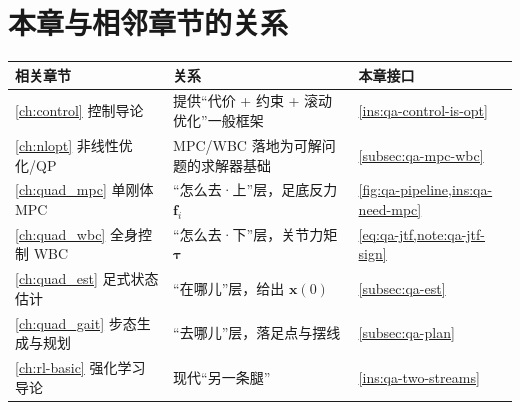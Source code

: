 \section*{本章与相邻章节的关系}
\begin{table}[H]\centering\small
\begin{tabular}{lll}
\toprule
相关章节 & 关系 & 本章接口 \\
\midrule
\cref{ch:control} 控制导论 & 提供“代价 + 约束 + 滚动优化”一般框架 & \cref{ins:qa-control-is-opt} \\
\cref{ch:nlopt} 非线性优化/QP & MPC/WBC 落地为可解问题的求解器基础 & \cref{subsec:qa-mpc-wbc} \\
\cref{ch:quad_mpc} 单刚体 MPC & “怎么去·上”层，足底反力 $\mathbf{f}_i$ & \cref{fig:qa-pipeline,ins:qa-need-mpc} \\
\cref{ch:quad_wbc} 全身控制 WBC & “怎么去·下”层，关节力矩 $\boldsymbol\tau$ & \cref{eq:qa-jtf,note:qa-jtf-sign} \\
\cref{ch:quad_est} 足式状态估计 & “在哪儿”层，给出 $\boldsymbol x(0)$ & \cref{subsec:qa-est} \\
\cref{ch:quad_gait} 步态生成与规划 & “去哪儿”层，落足点与摆线 & \cref{subsec:qa-plan} \\
\cref{ch:rl-basic} 强化学习导论 & 现代“另一条腿” & \cref{ins:qa-two-streams} \\
\bottomrule
\end{tabular}
\end{table}
